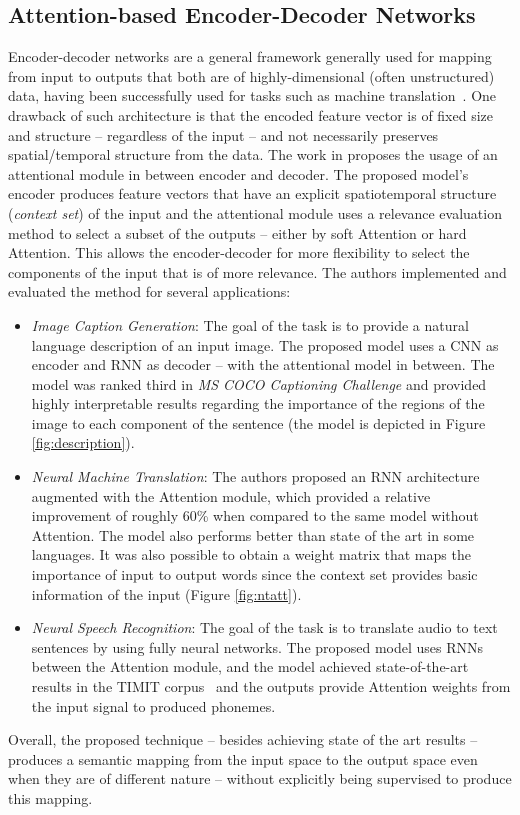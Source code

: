 \documentclass[12pt]{article}
\begin{document}
\subsection{Attention-based Encoder-Decoder Networks}
Encoder-decoder networks are a general framework generally used for mapping from input to outputs that both
are of highly-dimensional (often unstructured) data, having been successfully used for tasks such
as machine translation~\cite{ref:enc-dec-rnns}.
One drawback of such architecture is that the encoded feature vector is of fixed size and structure --
regardless of the input -- and not necessarily preserves spatial/temporal structure from the data.
The work in \cite{ref:enc-dec} proposes the usage of an attentional module in between encoder and decoder.
The proposed model's encoder produces feature vectors that have an explicit spatiotemporal structure
(\emph{context set}) of the input and the attentional module uses a relevance evaluation
method to select a subset of the outputs -- either by soft Attention or hard Attention.
This allows the encoder-decoder for more flexibility to select the components of the input that is of
more relevance.
The authors implemented and evaluated the method for several applications:
\begin{itemize}
    \item \emph{Image Caption Generation}: The goal of the task is to provide a natural language description of an input image.
        The proposed model uses a CNN as encoder and RNN as decoder -- with the attentional model in between.
        The model was ranked third in \emph{MS COCO Captioning Challenge} and provided highly interpretable
        results regarding the importance of the regions of the image to each component of the sentence
        (the model is depicted in Figure \ref{fig:description}).
    \item \emph{Neural Machine Translation}: The authors proposed an RNN architecture augmented with the Attention module, which provided a relative improvement of roughly 60\% when compared to the same model without Attention.
        The model also performs better than state of the art in some languages.
        It was also possible to obtain a weight matrix that maps the importance of input to output words since the context set provides basic information of the input (Figure \ref{fig:ntatt}).
    \item \emph{Neural Speech Recognition}: The goal of the task is to translate audio to text sentences by using fully neural networks.
        The proposed model uses RNNs between the Attention module, and the model achieved state-of-the-art results in the TIMIT corpus~\cite{ref:timit} and the outputs provide Attention weights from
        the input signal to produced phonemes.
\end{itemize}
Overall, the proposed technique -- besides achieving state of the art results --
produces a semantic mapping from the input space to the output space even when they are of different nature
-- without explicitly being supervised to produce this mapping.
\end{document}
